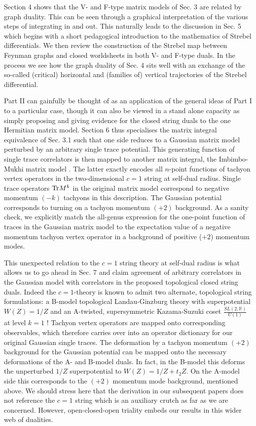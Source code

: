 \documentclass[english]{article}
\let\mb=\mathbb
\begin{document}
Section 4 shows that the V- and F-type matrix models of Sec. 3 are related by graph duality. This can be seen through a graphical interpretation of the various steps of integrating in and out. This naturally leads to the discussion in Sec. 5 which begins with a short pedagogical introduction to the mathematics of Strebel differentials. We then review the construction of the Strebel map between Feynman graphs and closed worldsheets in both V- and F-type duals. In the process we see how the graph duality of Sec. 4 sits well with an exchange of the so-called (critical) horizontal and (families of) vertical trajectories of the Strebel differential.  

Part II can gainfully be thought of as an application of the general ideas of Part I to a particular case, though it can also be viewed in a stand alone capacity as simply proposing and giving evidence for the closed string duals to the one Hermitian matrix model. 
Section 6 thus specialises the matrix integral equivalence of Sec. 3.1 such that one side reduces to a Gaussian matrix model perturbed by an arbitrary single trace potential. This generating function of single trace correlators is then mapped to another matrix integral, the Imbimbo-Mukhi matrix model \cite{ImbimboMukhi}. The latter exactly encodes all $n$-point functions of tachyon vertex operators in the two-dimensional $c=1$ string at self-dual radius. Single trace operators ${\rm Tr}M^k$ in the original matrix model correspond to negative momentum $(-k)$ tachyons in this description. The Gaussian potential corresponds to turning on a tachyon momentum $(+2)$ background.  As a sanity check, we explicitly match the all-genus expression for the one-point function of traces in the Gaussian matrix model to the expectation value of a negative momentum tachyon vertex operator in a background of positive ($+2$) momentum modes.

This unexpected relation to the $c=1$ string theory at self-dual radius is what allows us to go ahead in Sec. 7 and claim agreement of arbitrary correlators in the Gaussian model with correlators in the proposed topological closed string duals. Indeed the $c=1$-theory is known to admit two alternate, topological string formulations: a B-model topological Landau-Ginzburg theory with superpotential $W(Z)=1/Z$ \cite{ghoshalMukhiLG,ghoshalMukhiIm,hananyOzPlLG} and an A-twisted, supersymmetric Kazama-Suzuki coset $\frac{SL(2,\mb{R})}{U(1)}$ at level $k=1$ \cite{MukhiVafa, ashok2006topological}! Tachyon vertex operators are mapped onto corresponding observables, which therefore carries over into an operator dictionary for our original Gaussian single traces. The deformation by a tachyon momentum $(+2)$ background for the Gaussian potential can be mapped 
onto the necessary deformations of the A- and B-model duals. In fact, in the B-model this deforms the unperturbed $1/Z$ superpotential to $W(Z)=1/Z +t_{2}Z$. On the A-model side this corresponds to the $(+2)$ momentum mode background, mentioned above. We should stress here that the derivation in our subsequent papers does not reference the $c=1$ string which is an auxiliary crutch as far as we are concerned. However, open-closed-open triality embeds our results in this wider web of dualities. 
\end{document}
